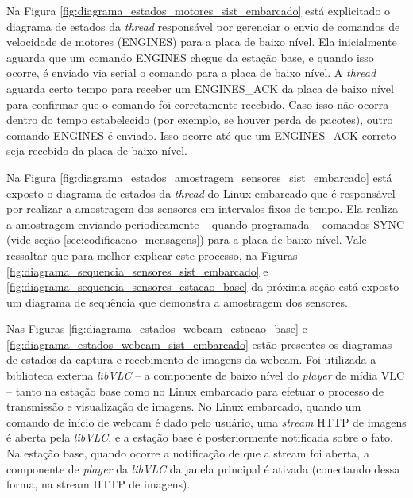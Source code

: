 Na Figura \ref{fig:diagrama_estados_motores_sist_embarcado} está explicitado o diagrama de estados da \textit{thread} responsável por gerenciar o envio de comandos de velocidade de motores (ENGINES) para a placa de baixo nível. Ela inicialmente aguarda que um comando ENGINES chegue da estação base, e quando isso ocorre, é enviado via serial o comando para a placa de baixo nível. A \textit{thread} aguarda certo tempo para receber um ENGINES\_ACK da placa de baixo nível para confirmar que o comando foi corretamente recebido. Caso isso não ocorra dentro do tempo estabelecido (por exemplo, se houver perda de pacotes), outro comando ENGINES é enviado. Isso ocorre até que um ENGINES\_ACK correto seja recebido da placa de baixo nível.

Na Figura \ref{fig:diagrama_estados_amostragem_sensores_sist_embarcado} está exposto o diagrama de estados da \textit{thread} do Linux embarcado que é responsável por realizar a amostragem dos sensores em intervalos fixos de tempo. Ela realiza a amostragem enviando periodicamente -- quando programada -- comandos SYNC (vide seção \ref{sec:codificacao_mensagens}) para a placa de baixo nível. Vale ressaltar que para melhor explicar este processo, na Figuras \ref{fig:diagrama_sequencia_sensores_sist_embarcado} e \ref{fig:diagrama_sequencia_sensores_estacao_base} da próxima seção está exposto um diagrama de sequência que demonstra a amostragem dos sensores.

Nas Figuras \ref{fig:diagrama_estados_webcam_estacao_base} e \ref{fig:diagrama_estados_webcam_sist_embarcado} estão presentes os diagramas de estados da captura e recebimento de imagens da webcam. Foi utilizada a biblioteca externa \textit{libVLC} \cite{vlc} -- a componente de baixo nível do \textit{player} de mídia VLC -- tanto na estação base como no Linux embarcado para efetuar o processo de transmissão e visualização de imagens. No Linux embarcado, quando um comando de início de webcam é dado pelo usuário, uma \textit{stream} HTTP de imagens é aberta pela \textit{libVLC}, e a estação base é posteriormente notificada sobre o fato. Na estação base, quando ocorre a notificação de que a stream foi aberta, a componente de \textit{player} da \textit{libVLC} da janela principal é ativada (conectando dessa forma, na stream HTTP de imagens).



